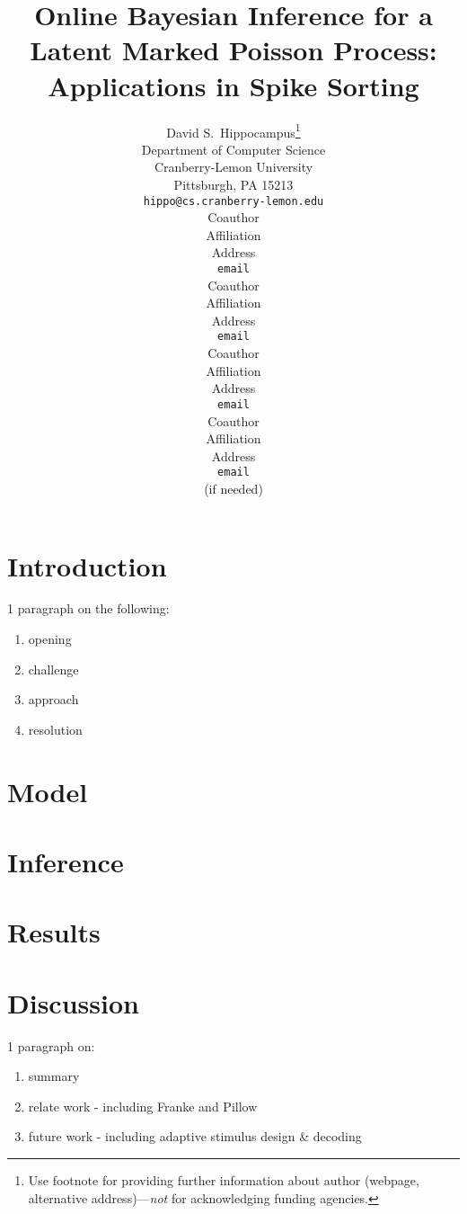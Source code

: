 \documentclass{article} %
\title{Online Bayesian Inference for a Latent Marked Poisson Process: Applications in Spike Sorting}
\author{
David S.~Hippocampus\thanks{ Use footnote for providing further information
about author (webpage, alternative address)---\emph{not} for acknowledging
funding agencies.} \\
Department of Computer Science\\
Cranberry-Lemon University\\
Pittsburgh, PA 15213 \\
\texttt{hippo@cs.cranberry-lemon.edu} \\
\And
Coauthor \\
Affiliation \\
Address \\
\texttt{email} \\
\AND
Coauthor \\
Affiliation \\
Address \\
\texttt{email} \\
\And
Coauthor \\
Affiliation \\
Address \\
\texttt{email} \\
\And
Coauthor \\
Affiliation \\
Address \\
\texttt{email} \\
(if needed)\\
}
\begin{document}
\maketitle

\begin{abstract}


\end{abstract}

\section{Introduction}


1 paragraph on the following:
\begin{enumerate}
	\item opening
	\item challenge
	\item approach
	\item resolution
\end{enumerate}


\section{Model}


\section{Inference}


\section{Results}


 
\section{Discussion}

1 paragraph on:
\begin{enumerate}
	\item summary
	\item relate work - including Franke and Pillow
	\item future work - including adaptive stimulus design \& decoding
\end{enumerate}


\begin{comment}
\subsubsection*{Acknowledgments}

Use unnumbered third level headings for the acknowledgments. All
acknowledgments go at the end of the paper. Do not include 
acknowledgments in the anonymized submission, only in the 
final paper. 
\end{comment}




\end{document}
